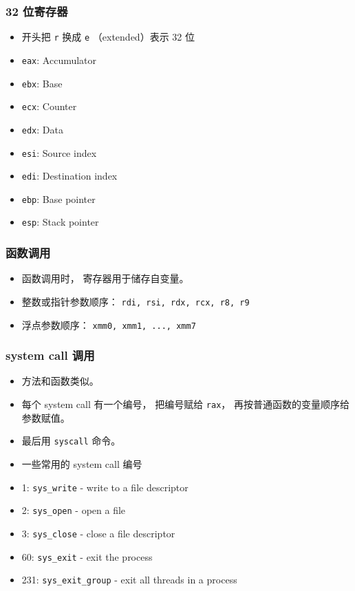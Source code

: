 \subsubsection{32 位寄存器}
\begin{itemize}
\item 开头把 \verb|r| 换成 \verb|e| （extended）表示 32 位
\item \verb|eax|: Accumulator
\item \verb|ebx|: Base
\item \verb|ecx|: Counter
\item \verb|edx|: Data
\item \verb|esi|: Source index
\item \verb|edi|: Destination index
\item \verb|ebp|: Base pointer
\item \verb|esp|: Stack pointer
\end{itemize}

\subsubsection{函数调用}
\begin{itemize}
\item 函数调用时， 寄存器用于储存自变量。
\item 整数或指针参数顺序： \verb|rdi, rsi, rdx, rcx, r8, r9|
\item 浮点参数顺序： \verb|xmm0, xmm1, ..., xmm7|
\end{itemize}

\subsubsection{system call 调用}
\begin{itemize}
\item 方法和函数类似。
\item 每个 system call 有一个编号， 把编号赋给 \verb|rax|， 再按普通函数的变量顺序给参数赋值。
\item 最后用 \verb|syscall| 命令。
\item 一些常用的 system call 编号
\item 1: \verb|sys_write| - write to a file descriptor
\item 2: \verb|sys_open| - open a file
\item 3: \verb|sys_close| - close a file descriptor
\item 60: \verb|sys_exit| - exit the process
\item 231: \verb|sys_exit_group| - exit all threads in a process
\end{itemize}

